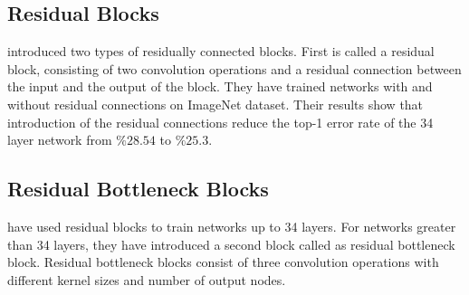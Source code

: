 \subsection{Residual Blocks}
\cite{He:2015aa} introduced two types of residually connected blocks. First is called a residual block, consisting of two convolution operations and a residual connection between the input and the output of the block. They have trained networks with and without residual connections on ImageNet dataset. Their results show that introduction of the residual connections reduce the top-1 error rate of the 34 layer network from $\%28.54$ to $\%25.3$.

\subsection{Residual Bottleneck Blocks}
\cite{He:2015aa} have used residual blocks to train networks up to 34 layers. For networks greater than 34 layers, they have introduced a second block called as residual bottleneck block. Residual bottleneck blocks consist of three convolution operations with different kernel sizes and number of output nodes. 

